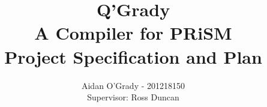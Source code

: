 \documentclass[11pt, a4paper]{article}
\begin{document}
\title{Q'Grady \\A Compiler for PRiSM \\
\large{Project Specification and Plan}}
\author{Aidan O'Grady - 201218150\\Supervisor: Ross Duncan}
\date{}
\maketitle
\end{document}
